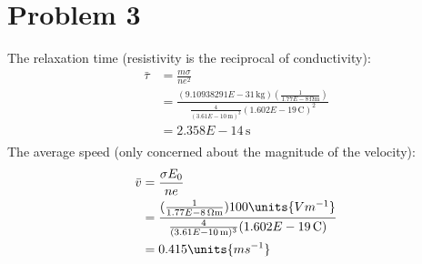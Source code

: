 \documentclass{article}
\newcommand{\unit}[1]{\ensuremath{\, \mathrm{#1}}}
\numberwithin{equation}{section}
\begin{document}
\section*{Problem 3}
The relaxation time (resistivity is the reciprocal of conductivity):
\begin{align*}
	\bar{\tau} &= \frac{m\sigma}{ne^2}\\
             &=\frac{(9.10938291E-31 \unit{kg})(\frac{1}{1.77E-8 \unit{\Omega m}})}{\frac{4}{(3.61E-10 \unit{m})^3} (1.602E-19 \unit{C})^2}\\
             &=2.358E-14 \unit {s}\\
\end{align*}
The average speed (only concerned about the magnitude of the velocity):
\begin{align*}
	\bar{v} &= \frac{\sigma E_0}{ne}\\
             &=\frac{(\frac{1}{1.77E-8 \unit{\Omega m}}) 100 \units{Vm^{-1}}}{\frac{4}{(3.61E-10 \unit{m})^3} (1.602E-19 \unit{C})}\\
     &=0.415 \units{ms^{-1}}\\
\end{align*}
\end{document}
